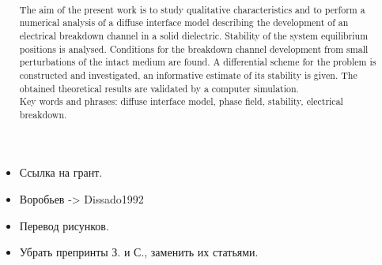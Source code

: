 \documentclass[a4paper,12pt]{article}
\title{
  \ArticleTitleEnglish
}
\author{
	\ArticleAuthorsEnglish \\[3mm]
	{\normalsize \ArticleInstitutes}
}
\date{\vspace{-0.8cm}}
\theoremstyle{plain}
\theoremstyle{remark}
\newcommand{\ArticleTitleEnglish}{
	Stability of stationary equilibrium solutions of a diffuse interface electrical breakdown model
      }
\newcommand{\ArticleAuthorsEnglish}{
	A.~S.~Ponomarev\textsuperscript{1}, E.~V.~Zipunova\textsuperscript{1}, E.~B.~Savenkov\textsuperscript{1}
}
\newcommand{\ArticleInstitutesEnglish}{
	\textsuperscript{1}Keldysh Institute of Applied Mathematics, Moscow, Russia
}
\begin{document}
{\bfseries
  \begin{itemize}
  \item Ссылка на грант.
  \item Воробьев -> Dissado1992
  \item Перевод рисунков.
  \item Убрать препринты З. и С., заменить их статьями.
  \end{itemize}
}



\maketitle

\renewcommand{\abstractname}{}
\renewcommand{\absnamepos}{empty}

\begin{abstract}
  
  
  
  The aim of the present work is to study qualitative characteristics
  and to perform a numerical analysis of a diffuse interface model
  describing the development of an electrical breakdown channel in a
  solid dielectric. Stability of the system equilibrium positions is
  analysed. Conditions for the breakdown channel development from
  small perturbations of the intact medium are found. A differential
  scheme for the problem is constructed and investigated, an
  informative estimate of its stability is given. The obtained
  theoretical results are validated by a computer simulation. \\[3mm]
  
  Key words and phrases: diffuse interface model, phase field,
  stability, electrical breakdown.
\end{abstract}














\printbibliography
\end{document}
